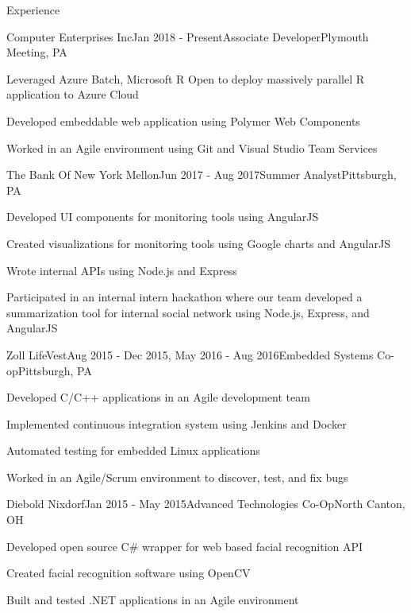 \documentclass{resume} %
\begin{document}
\begin{rSection}{Experience}


\begin{rSubsection}{Computer Enterprises Inc}{Jan 2018 - Present}{Associate Developer}{Plymouth Meeting, PA}
\item Leveraged Azure Batch, Microsoft R Open to deploy massively parallel R application to Azure Cloud
\item Developed embeddable web application using Polymer Web Components
\item Worked in an Agile environment using Git and Visual Studio Team Services
\end{rSubsection}

\begin{rSubsection}{The Bank Of New York Mellon}{Jun 2017 - Aug 2017}{Summer Analyst}{Pittsburgh, PA}
\item Developed UI components for monitoring tools using AngularJS
\item Created visualizations for monitoring tools using Google charts and AngularJS
\item Wrote internal APIs using Node.js and Express 
\item Participated in an internal intern hackathon where our team developed a summarization tool for internal social network using Node.js, Express, and AngularJS
\end{rSubsection}


\begin{rSubsection}{Zoll LifeVest}{Aug 2015 - Dec 2015, May 2016 - Aug 2016}{Embedded Systems Co-op}{Pittsburgh, PA}
\item Developed C/C++ applications in an Agile development team
\item Implemented continuous integration system using Jenkins and Docker
\item Automated testing for embedded Linux applications
\item Worked in an Agile/Scrum environment to discover, test, and fix bugs
\end{rSubsection}


\begin{rSubsection}{Diebold Nixdorf}{Jan 2015 - May 2015}{Advanced Technologies Co-Op}{North Canton, OH}
\item Developed open source C\# wrapper for web based facial recognition API
\item Created facial recognition software using OpenCV
\item Built and tested .NET applications in an Agile environment
\end{rSubsection}

\end{rSection}
\end{document}
